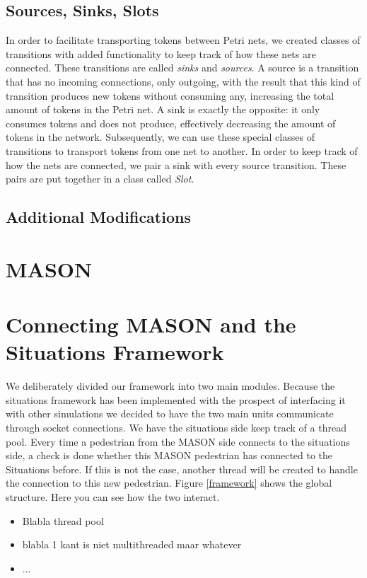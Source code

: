 \documentclass[11pt]{book}
\begin{document}
\subsection{Sources, Sinks, Slots}
In order to facilitate transporting tokens between Petri nets, we created classes of transitions with added functionality to keep track of how these nets are connected. These transitions are called \emph{sinks} and \emph{sources}. A source is a transition that has no incoming connections, only outgoing, with the result that this kind of transition produces new tokens without consuming any, increasing the total amount of tokens in the Petri net. A sink is exactly the opposite: it only consumes tokens and does not produce, effectively decreasing the amount of tokens in the network. Subsequently, we can use these special classes of transitions to transport tokens from one net to another. In order to keep track of how the nets are connected, we pair a sink with every source transition. These pairs are put together in a class called \emph{Slot}.

\subsection{Additional Modifications}


\section{MASON}

\section{Connecting MASON and the Situations Framework}
We deliberately divided our framework into two main modules. Because the situations framework has been implemented with the prospect of interfacing it with other simulations we decided to have the two main units communicate through socket connections. We have the situations side keep track of a thread pool. Every time a pedestrian from the MASON side connects to the situations side, a check is done whether this MASON pedestrian has connected to the Situations before. If this is not the case, another thread will be created to handle the connection to this new pedestrian.  Figure \ref{framework}  shows the global structure. Here you can see how the two interact.
\begin{itemize}
\item Blabla thread pool
\item blabla 1 kant is niet multithreaded maar whatever
\item ...
\end{itemize}
\end{document}

